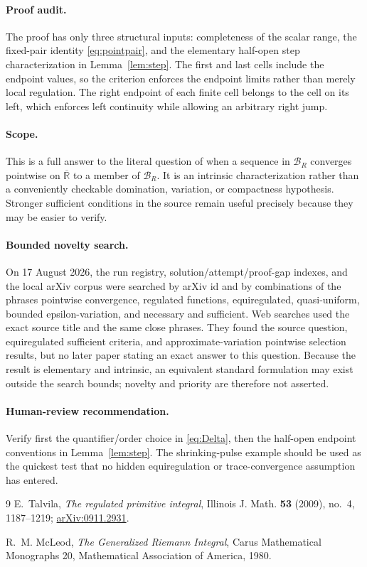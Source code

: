 \documentclass[11pt]{article}
\newcommand{\Rbar}{\overline{\mathbb R}}
\newcommand{\BR}{\mathcal B_R}
\begin{document}
\paragraph{Proof audit.}
The proof has only three structural inputs: completeness of the scalar
range, the fixed-pair identity \eqref{eq:pointpair}, and the elementary
half-open step characterization in Lemma~\ref{lem:step}.  The first and last
cells include the endpoint values, so the criterion enforces the endpoint
limits rather than merely local regulation.  The right endpoint of each
finite cell belongs to the cell on its left, which enforces left continuity
while allowing an arbitrary right jump.

\paragraph{Scope.}
This is a full answer to the literal question of when a sequence in
\(\BR\) converges pointwise on \(\Rbar\) to a member of \(\BR\).  It is an
intrinsic characterization rather than a conveniently checkable domination,
variation, or compactness hypothesis.  Stronger sufficient conditions in
the source remain useful precisely because they may be easier to verify.

\paragraph{Bounded novelty search.}
On 17 August 2026, the run registry, solution/attempt/proof-gap indexes, and
the local arXiv corpus were searched by arXiv id and by combinations of
the phrases pointwise convergence, regulated functions, equiregulated,
quasi-uniform, bounded epsilon-variation, and necessary and sufficient.
Web searches used the exact source title and the same close phrases.  They
found the source question, equiregulated sufficient criteria, and
approximate-variation pointwise selection results, but no later paper
stating an exact answer to this question.  Because the result is elementary
and intrinsic, an equivalent standard formulation may exist outside the
search bounds; novelty and priority are therefore not asserted.

\paragraph{Human-review recommendation.}
Verify first the quantifier/order choice in \eqref{eq:Delta}, then the
half-open endpoint conventions in Lemma~\ref{lem:step}.  The shrinking-pulse
example should be used as the quickest test that no hidden equiregulation or
trace-convergence assumption has entered.

\begin{thebibliography}{9}
E.~Talvila,
\emph{The regulated primitive integral},
Illinois J. Math. \textbf{53} (2009), no.~4, 1187--1219;
\href{https://arxiv.org/abs/0911.2931}{arXiv:0911.2931}.

R.~M. McLeod,
\emph{The Generalized Riemann Integral},
Carus Mathematical Monographs 20,
Mathematical Association of America, 1980.
\end{thebibliography}
\end{document}
